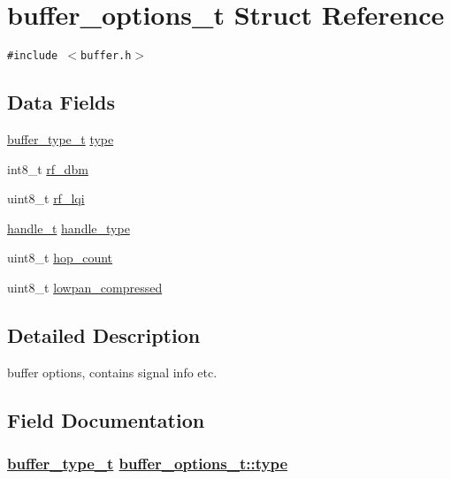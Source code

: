 \hypertarget{structbuffer__options__t}{
\section{buffer\_\-options\_\-t Struct Reference}
\label{structbuffer__options__t}
}
{\tt \#include $<$buffer.h$>$}

\subsection*{Data Fields}
\begin{CompactItemize}
\item 
\hyperlink{buffer_8h_1ee2fd526bf1d6e6d892b10466c7e725}{buffer\_\-type\_\-t} \hyperlink{structbuffer__options__t_d445f5550a95e734c8598f77a98147a5}{type}
\item 
int8\_\-t \hyperlink{structbuffer__options__t_7ab085df01d06758397a0a20ae7e456e}{rf\_\-dbm}
\item 
uint8\_\-t \hyperlink{structbuffer__options__t_2aec4493d07fae7bb2801231085d1bcb}{rf\_\-lqi}
\item 
\hyperlink{buffer_8h_03eee9524252e108b2762c560b60da9b}{handle\_\-t} \hyperlink{structbuffer__options__t_8b4126f357282f246c62623a7c04a0d5}{handle\_\-type}
\item 
uint8\_\-t \hyperlink{structbuffer__options__t_f6af386458431a08a8b738dd3836a3c6}{hop\_\-count}
\item 
uint8\_\-t \hyperlink{structbuffer__options__t_4ee6fc95c4cf1f37cf59c66a3f7984e5}{lowpan\_\-compressed}
\end{CompactItemize}


\subsection{Detailed Description}
buffer options, contains signal info etc. 



\subsection{Field Documentation}
\hypertarget{structbuffer__options__t_d445f5550a95e734c8598f77a98147a5}{
\subsubsection[type]{\setlength{\rightskip}{0pt plus 5cm}\hyperlink{buffer_8h_1ee2fd526bf1d6e6d892b10466c7e725}{buffer\_\-type\_\-t} \hyperlink{structbuffer__options__t_d445f5550a95e734c8598f77a98147a5}{buffer\_\-options\_\-t::type}}}
\label{structbuffer__options__t_d445f5550a95e734c8598f77a98147a5}


